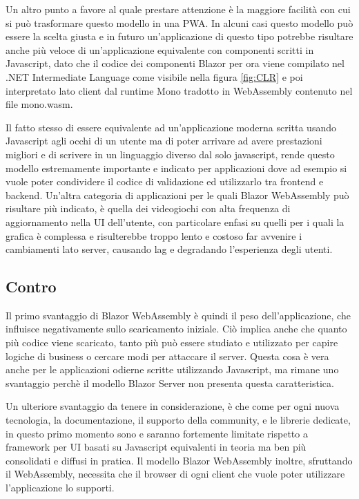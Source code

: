 Un altro punto a favore al quale prestare attenzione \`e la maggiore facilit\`a con cui si pu\`o trasformare questo modello in una PWA.
In alcuni casi questo modello pu\`o essere la scelta giusta e in futuro un'applicazione di questo tipo potrebbe risultare anche pi\`u veloce di un'applicazione equivalente con componenti scritti in Javascript, dato che il codice dei componenti Blazor per ora viene compilato nel .NET Intermediate Language come visibile nella figura \ref{fig:CLR} e poi interpretato lato client dal runtime Mono tradotto in WebAssembly contenuto nel file mono.wasm.

Il fatto stesso di essere equivalente ad un'applicazione moderna scritta usando Javascript agli occhi di un utente ma di poter arrivare ad avere prestazioni migliori e di scrivere in un linguaggio diverso dal solo javascript, rende questo modello estremamente importante e indicato per applicazioni dove ad esempio si vuole poter condividere il codice di validazione ed utilizzarlo tra frontend e backend.
Un'altra categoria di applicazioni per le quali Blazor WebAssembly pu\`o risultare pi\`u indicato, \`e quella dei videogiochi con alta frequenza di aggiornamento nella UI dell'utente, con particolare enfasi su quelli per i quali la grafica \`e complessa e risulterebbe troppo lento e costoso far avvenire i cambiamenti lato server, causando lag e degradando l'esperienza degli utenti.
 
\subsection{Contro}\label{sez:controBWA}
Il primo svantaggio di Blazor WebAssembly \`e quindi il peso dell'applicazione, che influisce negativamente sullo scaricamento iniziale.
Ci\`o implica anche che quanto pi\`u codice viene scaricato, tanto pi\`u pu\`o essere studiato e utilizzato per capire logiche di business o cercare modi per attaccare il server.
Questa cosa \`e vera anche per le applicazioni odierne scritte utilizzando Javascript, ma rimane uno svantaggio perch\`e il modello Blazor Server non presenta questa caratteristica.

Un ulteriore svantaggio da tenere in considerazione, \`e che come per ogni nuova tecnologia, la documentazione, il supporto della community, e le librerie dedicate, in questo primo momento sono e saranno fortemente limitate rispetto a framework per UI basati su Javascript equivalenti in teoria ma ben pi\`u consolidati e diffusi in pratica.
Il modello Blazor WebAssembly inoltre, sfruttando il WebAssembly, necessita che il browser di ogni client che vuole poter utilizzare l'applicazione lo supporti.

